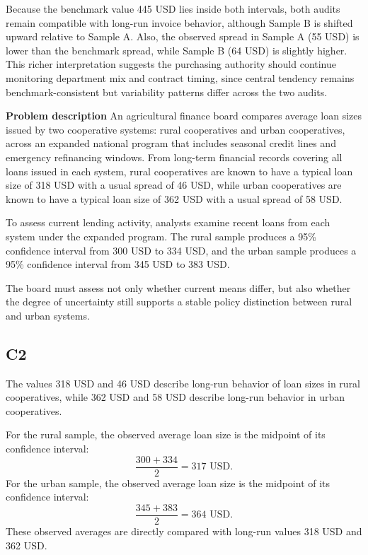 \begin{ExamProblems}
		Because the benchmark value 445 USD lies inside both intervals, both audits remain compatible with long-run invoice behavior, although Sample B is shifted upward relative to Sample A. Also, the observed spread in Sample A (55 USD) is lower than the benchmark spread, while Sample B (64 USD) is slightly higher. This richer interpretation suggests the purchasing authority should continue monitoring department mix and contract timing, since central tendency remains benchmark-consistent but variability patterns differ across the two audits.
		
		\newpage
		\item
		\textbf{Problem description}
		An agricultural finance board compares average loan sizes issued by two cooperative systems: rural cooperatives and urban cooperatives, across an expanded national program that includes seasonal credit lines and emergency refinancing windows. From long-term financial records covering all loans issued in each system, rural cooperatives are known to have a typical loan size of 318 USD with a usual spread of 46 USD, while urban cooperatives are known to have a typical loan size of 362 USD with a usual spread of 58 USD.
		
		To assess current lending activity, analysts examine recent loans from each system under the expanded program. The rural sample produces a 95\% confidence interval from 300 USD to 334 USD, and the urban sample produces a 95\% confidence interval from 345 USD to 383 USD.
		
		The board must assess not only whether current means differ, but also whether the degree of uncertainty still supports a stable policy distinction between rural and urban systems.
		
		\subsection*{C2}
		The values 318 USD and 46 USD describe long-run behavior of loan sizes in rural cooperatives, while 362 USD and 58 USD describe long-run behavior in urban cooperatives.
		
		For the rural sample, the observed average loan size is the midpoint of its confidence interval:
		\[
		\frac{300 + 334}{2} = 317 \text{ USD}.
		\]
		For the urban sample, the observed average loan size is the midpoint of its confidence interval:
		\[
		\frac{345 + 383}{2} = 364 \text{ USD}.
		\]
		These observed averages are directly compared with long-run values 318 USD and 362 USD.
		

\end{ExamProblems}
